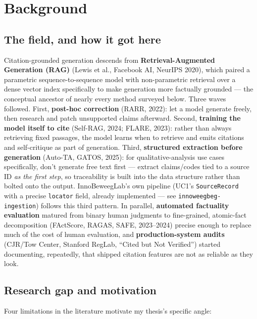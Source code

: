\section{Background}\label{sec:background}

\subsection{The field, and how it got here}\label{sec:field}

Citation-grounded generation descends from \textbf{Retrieval-Augmented Generation (RAG)} (Lewis et al., Facebook AI, NeurIPS 2020), which paired a parametric sequence-to-sequence model with non-parametric retrieval over a dense vector index specifically to make generation more factually grounded — the conceptual ancestor of nearly every method surveyed below. Three waves followed. First, \textbf{post-hoc correction} (RARR, 2022): let a model generate freely, then research and patch unsupported claims afterward. Second, \textbf{training the model itself to cite} (Self-RAG, 2024; FLARE, 2023): rather than always retrieving fixed passages, the model learns when to retrieve and emits citations and self-critique as part of generation. Third, \textbf{structured extraction before generation} (Auto-TA, GATOS, 2025): for qualitative-analysis use cases specifically, don't generate free text first — extract claims/codes tied to a source ID \textit{as the first step}, so traceability is built into the data structure rather than bolted onto the output. InnoBeweegLab's own pipeline (UC1's \texttt{SourceRecord} with a precise \texttt{locator} field, already implemented — see \texttt{innoweegbeg-ingestion}) follows this third pattern. In parallel, \textbf{automated factuality evaluation} matured from binary human judgments to fine-grained, atomic-fact decomposition (FActScore, RAGAS, SAFE, 2023–2024) precise enough to replace much of the cost of human evaluation, and \textbf{production-system audits} (CJR/Tow Center, Stanford RegLab, \textquotedblleft{}Cited but Not Verified\textquotedblright{}) started documenting, repeatedly, that shipped citation features are not as reliable as they look.



\subsection{Research gap and motivation}\label{sec:gap}

Four limitations in the literature motivate my thesis's specific angle:



